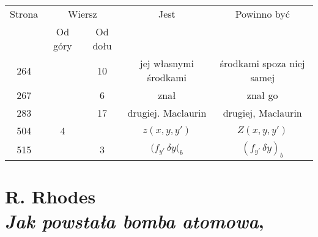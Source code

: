 \documentclass[a4paper,11pt]{article}
\numberwithin{equation}{section}
\begin{document}













\begin{center}

  \begin{tabular}{|c|c|c|c|c|}
    \hline
    Strona & \multicolumn{2}{c|}{Wiersz} & Jest
                              & Powinno być \\ \cline{2-3}
    & Od góry & Od dołu & & \\
    \hline
    264 & & 10 & jej własnymi środkami & środkami spoza niej samej \\
    267 & & \hphantom{0}6 & znał & znał go \\
    283 & & 17 & drugiej. Maclaurin & drugiej, Maclaurin \\
    504 & \hphantom{0}4 & & $z( x, y, y' )$ & $Z( x, y, y' )$ \\
    515 & & \hphantom{0}3 & $( f_{ y' } \, \delta y(_{ b }$
    & $( f_{ y' } \, \delta y )_{ b }$ \\
    \hline
  \end{tabular}

\end{center}

\VerSpaceTwo

















\newpage

\section{ %
  R. Rhodes \\
  \textit{Jak powstała bomba atomowa}, \cite{Rhodes00}}
\end{document}
